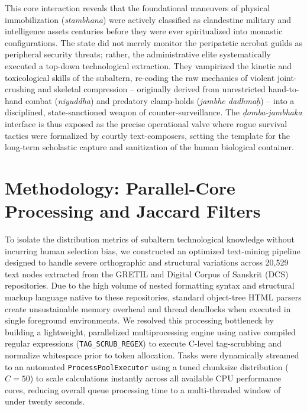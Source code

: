 \documentclass[11pt,twoside,letterpaper]{article}
\begin{document}
This core interaction reveals that the foundational maneuvers of physical immobilization (\textit{stambhana}) were actively classified as clandestine military and intelligence assets centuries before they were ever spiritualized into monastic configurations. The state did not merely monitor the peripatetic acrobat guilds as peripheral security threats; rather, the administrative elite systematically executed a top-down technological extraction. They vampirized the kinetic and toxicological skills of the subaltern, re-coding the raw mechanics of violent joint-crushing and skeletal compression – originally derived from unrestricted hand-to-hand combat (\textit{niyuddha}) and predatory clamp-holds (\textit{jambhe dadhmaḥ}) – into a disciplined, state-sanctioned weapon of counter-surveillance. The \textit{ḍomba-jambhaka} interface is thus exposed as the precise operational valve where rogue survival tactics were formalized by courtly text-composers, setting the template for the long-term scholastic capture and sanitization of the human biological container.

\section{Methodology: Parallel-Core Processing and Jaccard Filters}
To isolate the distribution metrics of subaltern technological knowledge without incurring human selection bias, we constructed an optimized text-mining pipeline designed to handle severe orthographic and structural variations across 20,529 text nodes extracted from the GRETIL and Digital Corpus of Sanskrit (DCS) repositories. Due to the high volume of nested formatting syntax and structural markup language native to these repositories, standard object-tree HTML parsers create unsustainable memory overhead and thread deadlocks when executed in single foreground environments. We resolved this processing bottleneck by building a lightweight, parallelized multiprocessing engine using native compiled regular expressions (\texttt{TAG\_SCRUB\_REGEX}) to execute C-level tag-scrubbing and normalize whitespace prior to token allocation. Tasks were dynamically streamed to an automated \texttt{ProcessPoolExecutor} using a tuned chunksize distribution ($C = 50$) to scale calculations instantly across all available CPU performance cores, reducing overall queue processing time to a multi-threaded window of under twenty seconds.
\end{document}
